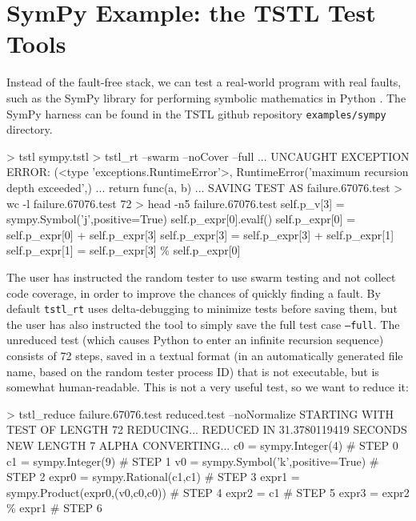 \section{SymPy Example: the TSTL Test Tools}

Instead of the fault-free stack, we can test a real-world program with real faults, such as the SymPy library for performing symbolic mathematics in Python \cite{SymPy}.  The SymPy harness can be found in the TSTL github repository {\tt examples/sympy} directory.

{\scriptsize
\begin{code}
 > tstl sympy.tstl
 > tstl\_rt --swarm --noCover --full
...
 UNCAUGHT EXCEPTION
 ERROR: (<type 'exceptions.RuntimeError'>,
 RuntimeError('maximum recursion depth exceeded',)
...
    return func(a, b)
...
 SAVING TEST AS failure.67076.test
 > wc -l failure.67076.test
 72
 > head -n5 failure.67076.test
 self.p\_v[3] = sympy.Symbol('j',positive=True) 
 self.p\_expr[0].evalf() 
 self.p\_expr[0] = self.p\_expr[0] + self.p\_expr[3] 
 self.p\_expr[3] = self.p\_expr[3] + self.p\_expr[1] 
 self.p\_expr[1] = self.p\_expr[3] \% self.p\_expr[0] 

\end{code}
}

The user has instructed the random tester to use swarm testing \cite{ISSTA12} and not collect code coverage, in order to improve the chances of quickly finding a fault.  By default {\tt tstl\_rt} uses delta-debugging to minimize tests before saving them, but the user has also instructed the tool to simply save the full test case {\tt --full}.  The unreduced test (which causes Python to enter an infinite recursion sequence) consists of 72 steps, saved in a textual format (in an automatically generated file name, based on the random tester process ID) that is not executable, but is somewhat human-readable.  This is not a very useful test, so we want to reduce it:

{\scriptsize
\begin{code}
 > tstl\_reduce failure.67076.test reduced.test --noNormalize
 STARTING WITH TEST OF LENGTH 72
 REDUCING...
 REDUCED IN 31.3780119419 SECONDS
 NEW LENGTH 7
 ALPHA CONVERTING...
 c0 = sympy.Integer(4)                                 \# STEP 0
 c1 = sympy.Integer(9)                                  \# STEP 1
 v0 = sympy.Symbol('k',positive=True)         \# STEP 2
 expr0 = sympy.Rational(c1,c1)                     \# STEP 3
 expr1 = sympy.Product(expr0,(v0,c0,c0))     \# STEP 4
 expr2 = c1                                                \# STEP 5
 expr3 = expr2 \% expr1                      \# STEP 6
\end{code}
}